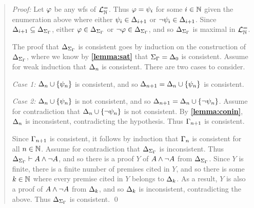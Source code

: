 \begin{quote} 
  \textit{Proof:} 
  Let $\varphi$ be any wfs of $\mathcal{L}^{=}_{\mathbb{N}}$.
  Thus $\varphi=\psi_i$ for some $i\in\mathbb{N}$ given the enumeration above where either $\psi_i\in\Delta_{i+1}$ or $\neg\psi_i\in\Delta_{i+1}$.
  Since $\Delta_{i+1}\subseteq\Delta_{\Sigma_{\Gamma}}$, either $\varphi\in\Delta_{\Sigma_{\Gamma}}$ or $\neg\varphi\in\Delta_{\Sigma_{\Gamma}}$, and so $\Delta_{\Sigma_{\Gamma}}$ is maximal in $\mathcal{L}^{=}_{\mathbb{N}}$.

  The proof that $\Delta_{\Sigma_{\Gamma}}$ is consistent goes by induction on the construction of $\Delta_{\Sigma_{\Gamma}}$, where we know by \textbf{\ref{lemma:sat}} that $\Sigma_{\Gamma}=\Delta_0$ is consistent. 
  Assume for weak induction that $\Delta_n$ is consistent. 
  There are two cases to consider.

  \textit{Case 1:} $\Delta_n\cup\lbrace\psi_n\rbrace$ is consistent, and so $\Delta_{n+1}=\Delta_n\cup\lbrace\psi_n\rbrace$ is consistent. 

  \textit{Case 2:} $\Delta_n\cup\lbrace\psi_n\rbrace$ is not consistent, and so $\Delta_{n+1}=\Delta_n\cup\lbrace\neg\psi_n\rbrace$. 
  Assume for contradiction that $\Delta_n\cup\lbrace\neg\psi_n\rbrace$ is not consistent. 
  By \textbf{\ref{lemma:conin}}, $\Delta_n$ is inconsistent, contradicting the hypothesis. 
  Thus $\Gamma_{n+1}$ is consistent. 

  Since $\Gamma_{n+1}$ is consistent, it follows by induction that $\Gamma_n$ is consistent for all $n\in\mathbb{N}$.
  Assume for contradiction that $\Delta_{\Sigma_{\Gamma}}$ is inconsistent.
  Thus $\Delta_{\Sigma_{\Gamma}}\vdash A\wedge\neg A$, and so there is a proof $Y$ of $A\wedge\neg A$ from $\Delta_{\Sigma_{\Gamma}}$. 
  Since $Y$ is finite, there is a finite number of premises cited in $Y$, and so there is some $k\in\mathbb{N}$ where every premise cited in $Y$ belongs to $\Delta_k$.
  As a result, $Y$ is also a proof of $A\wedge\neg A$ from $\Delta_k$, and so $\Delta_k$ is inconsistent, contradicting the above. 
  Thus $\Delta_{\Sigma_{\Gamma}}$ is consistent. 
  \qed
\end{quote}




